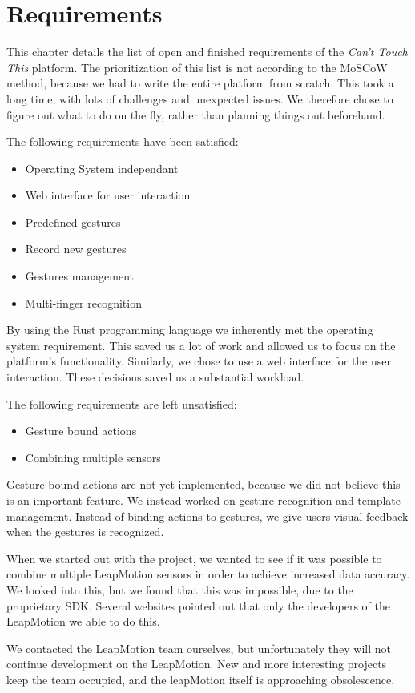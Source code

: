 \documentclass{standalone}
\begin{document}
  \section{Requirements}
  This chapter details the list of open and finished requirements of the
  \textit{Can't Touch This} platform. The prioritization of this list is not
  according to the MoSCoW method, because we had to write the entire platform
  from scratch. This took a long time, with lots of challenges and unexpected
  issues. We therefore chose to figure out what to do on the fly, rather than
  planning things out beforehand.

  The following requirements have been satisfied:
  \begin{itemize}
    \tightlist{}
    \item Operating System independant
    \item Web interface for user interaction
    \item Predefined gestures
    \item Record new gestures
    \item Gestures management
    \item Multi-finger recognition
  \end{itemize}
  By using the Rust programming language we inherently met the operating system
  requirement. This saved us a lot of work and allowed us to focus on the
  platform's functionality. Similarly, we chose to use a web interface for the
  user interaction. These decisions saved us a substantial workload.

  The following requirements are left unsatisfied:
  \begin{itemize}
    \tightlist{}
    \item Gesture bound actions
    \item Combining multiple sensors
  \end{itemize}
  Gesture bound actions are not yet implemented, because we did not believe this
  is an important feature. We instead worked on gesture recognition and template
  management. Instead of binding actions to gestures, we give users visual
  feedback when the gestures is recognized.

  When we started out with the project, we wanted to see if it was possible to
  combine multiple LeapMotion sensors in order to achieve increased data
  accuracy. We looked into this, but we found that this was impossible, due to
  the proprietary SDK. Several websites pointed out that only the developers of
  the LeapMotion we able to do this.

  We contacted the LeapMotion team ourselves, but unfortunately they will not
  continue development on the LeapMotion. New and more interesting projects keep
  the team occupied, and the leapMotion itself is approaching obsolescence.
  \clearpage
\end{document}
